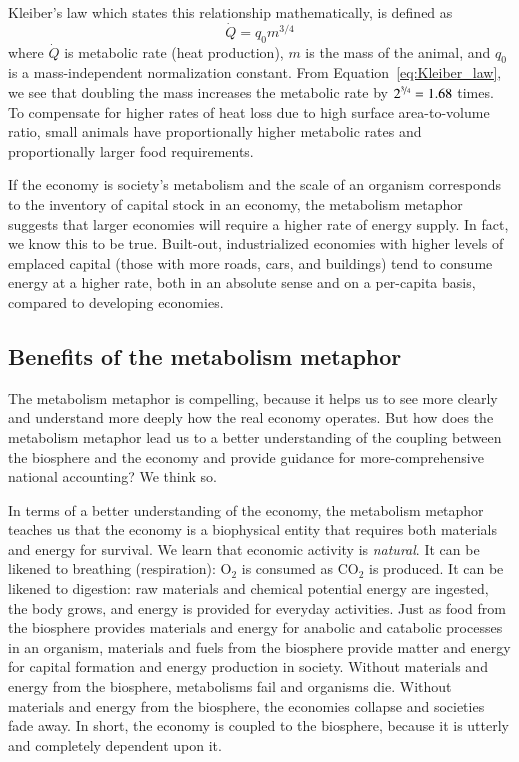 Kleiber's law which states this relationship mathematically,
is defined as
%
\begin{equation}\label{eq:Kleiber_law}
	\dot{Q} = q_{0} m^{3/4}
\end{equation}
%
where 
$\dot{Q}$ is metabolic rate (heat production),
$m$ is the mass of the animal, and
$q_{0}$ is a mass-independent normalization constant.
From Equation~\ref{eq:Kleiber_law},
we see that doubling the mass increases the metabolic rate by
$2^{\nicefrac{3}{4}} = 1.68$ times.
To compensate for higher rates of heat loss due to high surface area-to-volume ratio,
small animals have proportionally higher metabolic rates
and proportionally larger food requirements.

If the economy is society's metabolism and 
the scale of an organism corresponds to the inventory 
of capital stock in an economy, 
the metabolism metaphor suggests that larger economies 
will require a higher rate of energy supply.
In fact, we know this to be true.
Built-out, industrialized economies with higher levels of emplaced capital
(those with more roads, cars, and buildings)
tend to consume energy at a higher rate, 
both in an absolute sense and on a per-capita basis,
compared to developing economies.


\subsection{Benefits of the metabolism metaphor}
\label{sec:metabolism_helps}

The metabolism metaphor is compelling, 
because it helps us to see more clearly
and understand more deeply
how the real economy operates.
But how does the metabolism metaphor lead us to a better understanding 
of the coupling between the biosphere and the economy 
and provide guidance for more-comprehensive national accounting?
We think so.

In terms of a better understanding of the economy, 
the metabolism metaphor teaches us that the economy is a biophysical entity
that requires both materials and energy for survival.
We learn that economic activity is \emph{natural}.
It can be likened to breathing (respiration): 
O$_2$ is consumed as CO$_2$ is produced.
It can be likened to digestion:
raw materials and chemical potential energy are ingested, 
the body grows, 
and energy is provided for everyday activities.
Just as food from the biosphere provides materials and energy for
anabolic and catabolic processes in an organism, 
materials and fuels from the biosphere provide matter and energy for
capital formation and energy production in society.
Without materials and energy from the biosphere, 
metabolisms fail and organisms die. 
Without materials and energy from the biosphere,
the economies collapse and societies fade away.
In short, the economy is coupled to the biosphere,
because it is utterly and completely dependent upon it.

